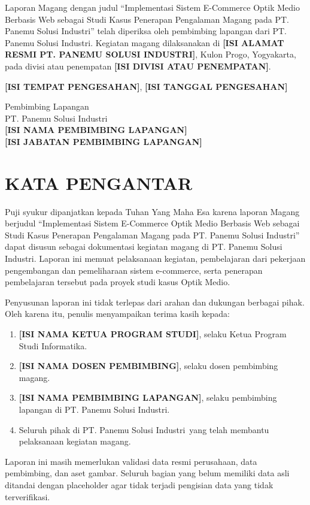 \documentclass[12pt,a4paper,oneside]{report}
\newcommand{\placeholder}[1]{\textbf{[#1]}}
\newcommand{\programstudi}{Informatika}
\newcommand{\tempatmagang}{PT. Panemu Solusi Industri}
\newcommand{\lokasimagang}{Kulon Progo, Yogyakarta}
\newcommand{\alamatmagang}{\placeholder{ISI ALAMAT RESMI PT. PANEMU SOLUSI INDUSTRI}}
\newcommand{\proyekstudi}{Optik Medio}
\newcommand{\judul}{Implementasi Sistem E-Commerce Optik Medio Berbasis Web sebagai Studi Kasus Penerapan Pengalaman Magang pada PT. Panemu Solusi Industri}
\begin{document}
Laporan Magang dengan judul ``\judul'' telah diperiksa oleh pembimbing lapangan dari \tempatmagang. Kegiatan magang dilaksanakan di \alamatmagang, \lokasimagang, pada divisi atau penempatan \placeholder{ISI DIVISI ATAU PENEMPATAN}.

\vspace{1cm}
\begin{center}
\placeholder{ISI TEMPAT PENGESAHAN}, \placeholder{ISI TANGGAL PENGESAHAN}
\end{center}

\vspace{0.8cm}
\begin{flushright}
Pembimbing Lapangan\\
\tempatmagang\\
\vspace{2.5cm}
\placeholder{ISI NAMA PEMBIMBING LAPANGAN}\\
\placeholder{ISI JABATAN PEMBIMBING LAPANGAN}
\end{flushright}

\chapter*{KATA PENGANTAR}

Puji syukur dipanjatkan kepada Tuhan Yang Maha Esa karena laporan Magang berjudul ``\judul'' dapat disusun sebagai dokumentasi kegiatan magang di \tempatmagang. Laporan ini memuat pelaksanaan kegiatan, pembelajaran dari pekerjaan pengembangan dan pemeliharaan sistem e-commerce, serta penerapan pembelajaran tersebut pada proyek studi kasus \proyekstudi.

Penyusunan laporan ini tidak terlepas dari arahan dan dukungan berbagai pihak. Oleh karena itu, penulis menyampaikan terima kasih kepada:

\begin{enumerate}
  \item \placeholder{ISI NAMA KETUA PROGRAM STUDI}, selaku Ketua Program Studi \programstudi.
  \item \placeholder{ISI NAMA DOSEN PEMBIMBING}, selaku dosen pembimbing magang.
  \item \placeholder{ISI NAMA PEMBIMBING LAPANGAN}, selaku pembimbing lapangan di \tempatmagang.
  \item Seluruh pihak di \tempatmagang\ yang telah membantu pelaksanaan kegiatan magang.
\end{enumerate}

Laporan ini masih memerlukan validasi data resmi perusahaan, data pembimbing, dan aset gambar. Seluruh bagian yang belum memiliki data asli ditandai dengan placeholder agar tidak terjadi pengisian data yang tidak terverifikasi.
\end{document}
